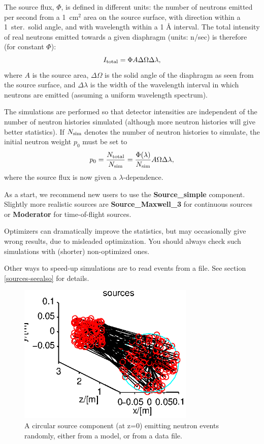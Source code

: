 The source flux, $\Phi$, is defined in different units:
the number of neutrons emitted per second from a
1~cm$^2$ area on the source surface,
with direction within a 1~ster.\ solid angle,
and with wavelength within a 1 {\AA} interval.
The total intensity of real neutrons emitted towards a given diaphragm
(units: n/sec) is therefore (for constant $\Phi$):
\begin{equation}
I_{\rm total} = \Phi A \Delta\Omega \Delta\lambda ,
\end{equation}
where $A$ is the source area, $\Delta\Omega$ is the solid angle of the
diaphragm as seen from the source surface, and $\Delta\lambda$ is the
width of the wavelength interval in which neutrons are emitted (assuming
a uniform wavelength spectrum).

The simulations are performed so that detector intensities
are independent of the number of neutron histories simulated
(although more neutron histories will give better statistics).
If $N_{\rm sim}$ denotes the number of
neutron histories to simulate, the initial neutron weight $p_0$ must be set to
\begin{equation}
\label{proprule}
p_0 = \frac{N_{\rm total}}{N_{\rm sim}} =
    \frac{\Phi(\lambda)}{N_{\rm sim}} A \Omega \Delta\lambda ,
\end{equation}
where the source flux is now given a $\lambda$-dependence.

As a start, we recommend new \MCS users to use the
{\bf Source\_simple} component.
Slightly more realistic sources are {\bf Source\_Maxwell\_3} for
continuous sources or {\bf Moderator} for time-of-flight sources.

Optimizers can dramatically improve the statistics, but may occasionally
give wrong results, due to misleaded optimization.
You should always check such simulations with (shorter) non-optimized ones.

Other ways to speed-up simulations are to read events from a file.
See section \ref{sources-seealso} for details.

\begin{figure}
  \begin{center}
    \includegraphics[width=0.75\textwidth]{figures/sources.eps}
  \end{center}
\caption{A circular source component (at z=0) emitting neutron events randomly, either from a model, or from a data file.}
\label{f:source}
\end{figure}


